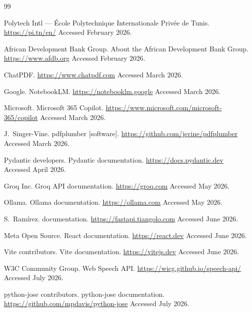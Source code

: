 \begin{thebibliography}{99}
\setcounter{NAT@ctr}{14}

Polytech Intl --- \'Ecole Polytechnique Internationale Priv\'ee de Tunis.
\newblock \url{https://pi.tn/en/}
\newblock Accessed February 2026.

African Development Bank Group.
\newblock About the African Development Bank Group.
\newblock \url{https://www.afdb.org}
\newblock Accessed February 2026.

ChatPDF.
\newblock \url{https://www.chatpdf.com}
\newblock Accessed March 2026.

Google.
\newblock NotebookLM.
\newblock \url{https://notebooklm.google}
\newblock Accessed March 2026.

Microsoft.
\newblock Microsoft 365 Copilot.
\newblock \url{https://www.microsoft.com/microsoft-365/copilot}
\newblock Accessed March 2026.

J.~Singer-Vine.
\newblock pdfplumber [software].
\newblock \url{https://github.com/jsvine/pdfplumber}
\newblock Accessed March 2026.

Pydantic developers.
\newblock Pydantic documentation.
\newblock \url{https://docs.pydantic.dev}
\newblock Accessed April 2026.

Groq Inc.
\newblock Groq {API} documentation.
\newblock \url{https://groq.com}
\newblock Accessed May 2026.

Ollama.
\newblock Ollama documentation.
\newblock \url{https://ollama.com}
\newblock Accessed May 2026.

S.~Ram{\'i}rez.
 documentation.
\newblock \url{https://fastapi.tiangolo.com}
\newblock Accessed June 2026.

Meta Open Source.
\newblock React documentation.
\newblock \url{https://react.dev}
\newblock Accessed June 2026.

Vite contributors.
\newblock Vite documentation.
\newblock \url{https://vitejs.dev}
\newblock Accessed June 2026.

W3C Community Group.
\newblock Web Speech {API}.
\newblock \url{https://wicg.github.io/speech-api/}
\newblock Accessed July 2026.

python-jose contributors.
\newblock python-jose documentation.
\newblock \url{https://github.com/mpdavis/python-jose}
\newblock Accessed July 2026.


\end{thebibliography}
